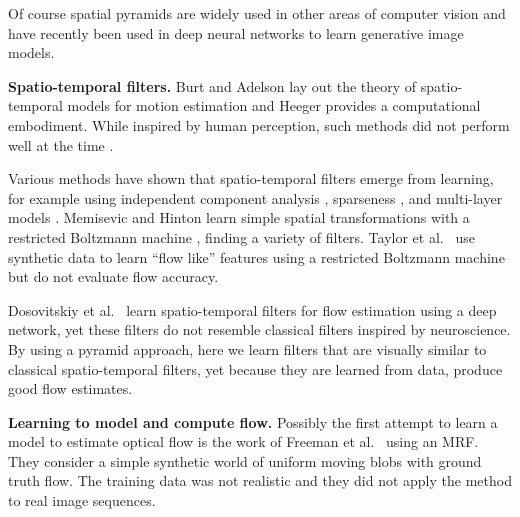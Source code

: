 \documentclass[10pt,twocolumn,letterpaper]{article}
\newcommand\myworries[1]{\textcolor{red}{#1}}
\begin{document}
Of course spatial pyramids are widely used in other areas of computer vision and have recently been used in deep neural networks \cite{denton2015deep} to learn generative image models.


{\bf Spatio-temporal filters.}
Burt and Adelson \cite{adelson1985spatiotemporal} lay out the theory of spatio-temporal models for motion estimation  and 
Heeger \cite{heeger1987model} provides a computational embodiment.
While inspired by human perception, such methods did not perform well at the time \cite{barron94-ijcv}.


Various methods have shown that spatio-temporal filters emerge from learning, for example using independent component analysis \cite{vanHateren:1998}, sparseness \cite{olshausen2003learning}, and multi-layer models \cite{cadieu2008learning}.
Memisevic and Hinton learn simple spatial transformations with a restricted Boltzmann machine \cite{memisevic2010learning}, finding a variety of filters.
Taylor et al.~\cite{taylor2010convolutional} use synthetic data to learn ``flow like'' features using a restricted Boltzmann machine but do not evaluate flow accuracy.

Dosovitskiy et al.~\cite{dosovitskiy2015flownet} learn spatio-temporal filters for flow estimation using a deep network, yet these filters do not resemble classical filters inspired by neuroscience.
By using a pyramid approach, here we learn filters that are visually similar to classical spatio-temporal filters, yet because they are learned from data, produce good flow estimates.






{\bf Learning to model and compute flow.}
Possibly the first attempt to learn a model to estimate optical flow is the work of Freeman et al.~\cite{Freeman2000} using an MRF.
They consider a simple synthetic world of uniform moving blobs with ground truth flow.
The training data was not realistic and they did not apply the method to real image sequences. 
\end{document}
